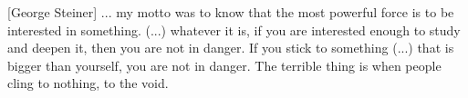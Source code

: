 

\begin{ntquote}

[George Steiner]{%
... my motto was to know that the most powerful force is to be interested in something.
(...) whatever it is, if you are interested enough to study and deepen it, then you are not in danger.
If you stick to something (...) that is bigger than yourself,
you are not in danger. The terrible thing is when people cling to nothing, to the void.%
}

\end{ntquote}